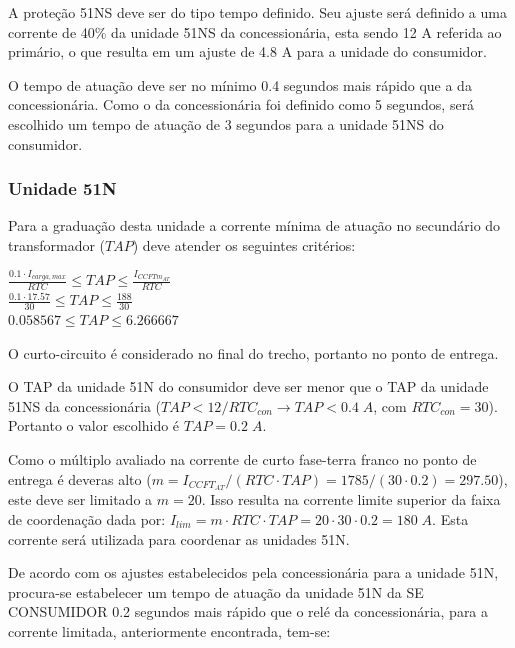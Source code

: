 A proteção 51NS deve ser do tipo tempo definido. Seu ajuste será definido a uma corrente de 40\% da unidade 51NS da concessionária, esta sendo 12 A referida ao primário, o que resulta em um ajuste de 4.8 A para a unidade do consumidor.

O tempo de atuação deve ser no mínimo 0.4 segundos mais rápido que a da concessionária. Como o da concessionária foi definido como 5 segundos, será escolhido um tempo de atuação de 3 segundos para a unidade 51NS do consumidor.

\subsubsection{Unidade 51N}

Para a graduação desta unidade a corrente mínima de atuação no secundário do transformador ($TAP$) deve atender os seguintes critérios:

\begin{center}
$\frac{0.1 \cdot I_{carga,max}}{RTC} \leq TAP \leq \frac{I_{CCFTm_{AT}} }{RTC}$ \\ \vspace{5pt}
$\frac{0.1 \cdot 17.57}{30} \leq TAP \leq \frac{188}{30}$ \\ \vspace{5pt}
$0.058567 \leq TAP \leq 6.266667$ \\ \vspace{5pt}
\end{center}

O curto-circuito é considerado no final do trecho, portanto no ponto de entrega.

O TAP da unidade 51N do consumidor deve ser menor que o TAP da unidade 51NS da concessionária ($TAP < 12/RTC_{con} \longrightarrow TAP < 0.4 \; A$, com $RTC_{con}=30$). Portanto o valor escolhido é $TAP = 0.2 \; A$. 

Como o múltiplo avaliado na corrente de curto fase-terra franco no ponto de entrega é deveras alto ($m = I_{CCFT_{AT}}/(RTC \cdot TAP) = 1785/(30 \cdot 0.2) = 297.50$), este deve ser limitado a $m=20$. Isso resulta na corrente limite superior da faixa de coordenação dada por: $I_{lim} = m \cdot RTC \cdot TAP = 20 \cdot 30 \cdot 0.2 = 180 \; A$. Esta corrente será utilizada para coordenar as unidades 51N.

De acordo com os ajustes estabelecidos pela concessionária para a unidade 51N, procura-se estabelecer um tempo de atuação da unidade 51N da SE CONSUMIDOR 0.2 segundos mais rápido que o relé da concessionária, para a corrente limitada, anteriormente encontrada, tem-se:

